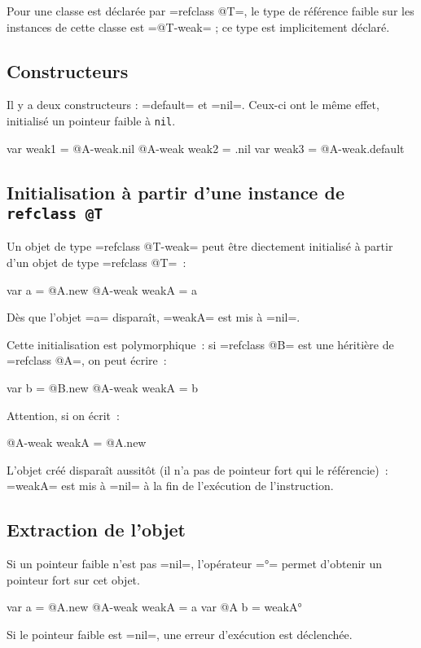 Pour une classe est déclarée par \ggs=refclass @T=, le type de référence faible sur les instances de cette classe est \ggs=@T-weak= ; ce type est implicitement déclaré.







\subsection{Constructeurs}

Il y a deux constructeurs : \ggs=default= et \ggs=nil=. Ceux-ci ont le même effet, initialisé un pointeur faible à \texttt{nil}.

\begin{galgas}
  var weak1 = @A-weak.nil
  @A-weak weak2 = .nil
  var weak3 = @A-weak.default
\end{galgas}


\subsection{Initialisation à partir d'une instance de \texttt{refclass @T}}

Un objet de type \ggs=refclass @T-weak= peut être diectement initialisé à partir d'un objet de type \ggs=refclass @T=~:
\begin{galgas}
  var a = @A.new
  @A-weak weakA = a
\end{galgas}

Dès que l'objet \ggs=a= disparaît, \ggs=weakA= est mis à \ggs=nil=.

Cette initialisation est polymorphique~: si \ggs=refclass @B= est une héritière de \ggs=refclass @A=, on peut écrire~:
\begin{galgas}
  var b = @B.new
  @A-weak weakA = b
\end{galgas}

Attention, si on écrit~:
\begin{galgas}
  @A-weak weakA = @A.new
\end{galgas}
L'objet créé disparaît aussitôt (il n'a pas de pointeur fort qui le référencie)~: \ggs=weakA= est mis à \ggs=nil= à la fin de l'exécution de l'instruction.


\subsection{Extraction de l'objet}

Si un pointeur faible n'est pas \ggs=nil=, l'opérateur \ggs=°= permet d'obtenir un pointeur fort sur cet objet.
\begin{galgas}
  var a = @A.new
  @A-weak weakA = a
  var @A b = weakA°
\end{galgas}
Si le pointeur faible est \ggs=nil=, une erreur d'exécution est déclenchée.



